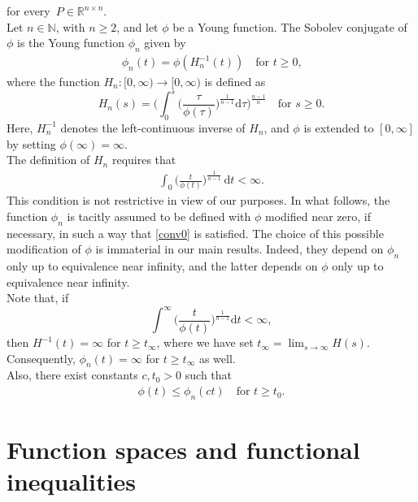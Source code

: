 \documentclass[leqno,11pt]{amsart}%
\numberwithin{equation}{section}
\def\R{\mathbb R}
\def\d{\mathrm{d}}
\theoremstyle{definition}
\numberwithin{equation}{section}
\begin{document}
  for every~$P\in \R^{n\times n}$.
\\ 
Let $n \in \mathbb N$, with $n\geq 2$, and let $\phi$ be a Young function.
The Sobolev conjugate  of $\phi$ is the Young function $\phi_n$ given by
\begin{align}
    \label{phin}
    \phi_n(t) = \phi (H_n^{-1}(t)) \quad \text{for $t \geq 0$,}
\end{align}
where the function
$H_n: [0, \infty) \to [0, \infty)$
is defined as
\begin{equation}\label{Hn}
H_n(s) =\bigg(\int_0^s\Big(\frac\tau{\phi(\tau)}\Big)^{\frac1{n-1}}\d\tau\bigg)^{\frac{n-1}{n}} \quad \text{for $s \geq 0$.}
\end{equation} 
Here, $H_n^{-1}$ denotes the left-continuous inverse of $H_n$, and $\phi$ is extended to $[0, \infty]$ by setting $\phi(\infty)=\infty$. 
\\ The definition of $H_n$ requires that
\begin{align}
    \label{conv0}
\int_0\Big(\frac{t}{\phi(t)}\Big)^{\frac{1}{n-1}}\, \d t < \infty.
\end{align}
 This condition is not restrictive in view of our purposes. 
In what follows, the function $\phi_n$ is tacitly assumed to be defined with $\phi$ modified near zero, if necessary, in such a way that \eqref{conv0} is satisfied. The choice of this possible modification of $\phi$ is immaterial in our main results. Indeed, they  depend on  $\phi_n$ only up to equivalence near infinity, and the latter depends  on $\phi$ only up to equivalence near infinity. 
\\ Note that, if
\begin{equation}\label{convinf}
    \int^\infty\Big(\frac{t}{\phi(t)}\Big)^{\frac{1}{n-1}}\d t<\infty,
\end{equation}
then $H^{-1}(t)=\infty$ for $t\ge t_\infty$, where we have set $t_\infty =\lim_{s\to\infty} 
H(s)$. Consequently,  $\phi_n(t)=\infty$ for $t\ge t_\infty$ as well.
\\ Also, there exist constants $c, t_0 >0$ such that
\begin{align}
    \label{july60}
    \phi(t) \leq \phi_n(ct) \quad \text{for $t\geq t_0$.}
\end{align}

\section{Function spaces and functional inequalities}\label{spaces}
\end{document}
